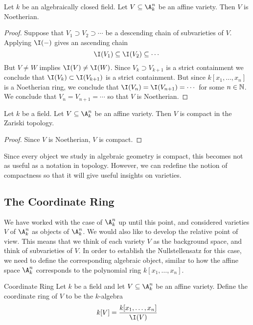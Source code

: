 \documentclass[a4paper]{article}
\begin{document}
\begin{prp}{}{} Let $k$ be an algebraically closed field. Let $V\subseteq\A_k^n$ be an affine variety. Then $V$ is Noetherian. 
\begin{proof}
Suppose that $V_1\supset V_2\supset\cdots$ be a descending chain of subvarieties of $V$. Applying $\I(-)$ gives an ascending chain $$\I(V_1)\subseteq\I(V_2)\subseteq\cdots$$ But $V\neq W$ implies $\I(V)\neq\I(W)$. Since $V_k\supset V_{k+1}$ is a strict containment we conclude that $\I(V_k)\subset\I(V_{k+1})$ is a strict containment. But since $k[x_1,\dots,x_n]$ is a Noetherian ring, we conclude that $\I(V_n)=\I(V_{n+1})=\cdots$ for some $n\in\mathbb{N}$. We conclude that $V_n=V_{n+1}=\cdots$ so that $V$ is Noetherian. 
\end{proof}
\end{prp}

\begin{crl}{}{} Let $k$ be a field. Let $V\subseteq\A_k^n$ be an affine variety. Then $V$ is compact in the Zariski topology. 
\begin{proof}
Since $V$ is Noetherian, $V$ is compact. 
\end{proof}
\end{crl}

Since every object we study in algebraic geometry is compact, this becomes not as useful as a notation in topology. However, we can redefine the notion of compactness so that it will give useful insights on varieties. 

\subsection{The Coordinate Ring}
We have worked with the case of $\A_k^n$ up until this point, and considered varieties $V$ of $\A_k^n$  as objects of $\A_k^n$. We would also like to develop the relative point of view. This means that we think of each variety $V$ as the background space, and think of subvarieties of $V$. In order to establish the Nullstellensatz for this case, we need to define the corresponding algebraic object, similar to how the affine space $\A_k^n$ corresponds to the polynomial ring $k[x_1,\dots,x_n]$. 

\begin{defn}{Coordinate Ring}{} Let $k$ be a field and let $V\subseteq\A_k^n$ be an affine variety. Define the coordinate ring of $V$ to be the $k$-algebra $$k[V]=\frac{k[x_1,\dots,x_n]}{\I(V)}$$
\end{defn}
\end{document}

